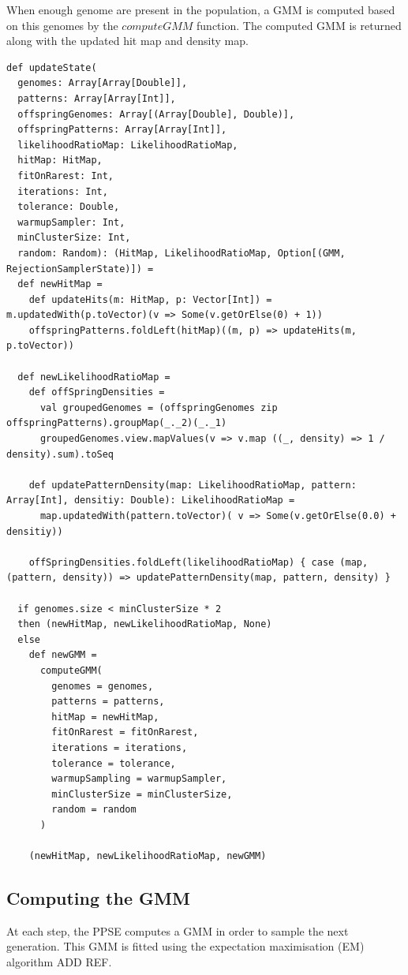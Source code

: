 \documentclass[10pt,a4paper]{article}
\theoremstyle{definition}
\theoremstyle{remark}
\begin{document}
When enough genome are present in the population, a GMM is computed based on this genomes by the $computeGMM$ function. The computed GMM is returned along with the updated hit map and density map.

\begin{lstlisting}[caption={Update State},label={lst:updateState}]
def updateState(
  genomes: Array[Array[Double]],
  patterns: Array[Array[Int]],
  offspringGenomes: Array[(Array[Double], Double)],
  offspringPatterns: Array[Array[Int]],
  likelihoodRatioMap: LikelihoodRatioMap,
  hitMap: HitMap,
  fitOnRarest: Int,
  iterations: Int,
  tolerance: Double,
  warmupSampler: Int,
  minClusterSize: Int,
  random: Random): (HitMap, LikelihoodRatioMap, Option[(GMM, RejectionSamplerState)]) =
  def newHitMap =
    def updateHits(m: HitMap, p: Vector[Int]) = m.updatedWith(p.toVector)(v => Some(v.getOrElse(0) + 1))
    offspringPatterns.foldLeft(hitMap)((m, p) => updateHits(m, p.toVector))

  def newLikelihoodRatioMap =
    def offSpringDensities =
      val groupedGenomes = (offspringGenomes zip offspringPatterns).groupMap(_._2)(_._1)
      groupedGenomes.view.mapValues(v => v.map ((_, density) => 1 / density).sum).toSeq

    def updatePatternDensity(map: LikelihoodRatioMap, pattern: Array[Int], densitiy: Double): LikelihoodRatioMap =
      map.updatedWith(pattern.toVector)( v => Some(v.getOrElse(0.0) + densitiy))

    offSpringDensities.foldLeft(likelihoodRatioMap) { case (map, (pattern, density)) => updatePatternDensity(map, pattern, density) }

  if genomes.size < minClusterSize * 2
  then (newHitMap, newLikelihoodRatioMap, None)
  else
    def newGMM =
      computeGMM(
        genomes = genomes,
        patterns = patterns,
        hitMap = newHitMap,
        fitOnRarest = fitOnRarest,
        iterations = iterations,
        tolerance = tolerance,
        warmupSampling = warmupSampler,
        minClusterSize = minClusterSize,
        random = random
      )

    (newHitMap, newLikelihoodRatioMap, newGMM)
\end{lstlisting}


\subsection{Computing the GMM}\label{sec. computeGMM}

At each step, the PPSE computes a GMM in order to sample the next generation. This GMM is fitted using the expectation maximisation (EM) algorithm {\color{red} ADD REF}. 
\end{document}
